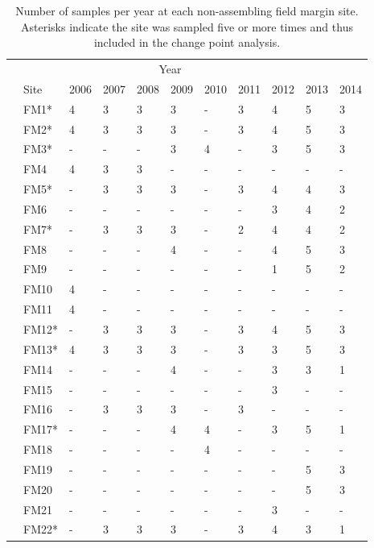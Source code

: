 \documentclass[12pt]{article}
\begin{document}
\begin{table}
  \renewcommand*\arraystretch{1.25}
  \centering
  \caption{Number of samples per year at each non-assembling field
    margin site. Asterisks indicate the site was sampled five or more times
    and thus included in the change point analysis.} 
  \begin{tabular}{lllllllllll}
    \hline
    \multicolumn{10}{c}{\hspace{10em}Year}\\
    & Site & 2006 & 2007 & 2008 & 2009 & 2010 & 2011 & 2012 & 2013 & 2014\\
    \hline
    &FM1* & 4 & 3 & 3 & 3 & - & 3 & 4 & 5 & 3\\
    &FM2* & 4 & 3 & 3 & 3 & - & 3 & 4 & 5 & 3\\
    &FM3* & - & - & - & 3 & 4 & - & 3 & 5 & 3\\
    &FM4 & 4 & 3 & 3 & - & - & - & - & - & -\\
    &FM5* & - & 3 & 3 & 3 & - & 3 & 4 & 4 & 3\\
    &FM6 & - & - & - & - & - & - & 3 & 4 & 2\\
    &FM7* & - & 3 & 3 & 3 & - & 2 & 4 & 4 & 2\\
    &FM8 & - & - & - & 4 & - & - & 4 & 5 & 3\\
    &FM9 & - & - & - & - & - & - & 1 & 5 & 2\\
    &FM10 & 4 & - & - & - & - & - & - & - & -\\
    &FM11 & 4 & - & - & - & - & - & - & - & -\\
    &FM12* & - & 3 & 3 & 3 & - & 3 & 4 & 5 & 3\\
    &FM13* & 4 & 3 & 3 & 3 & - & 3 & 3 & 5 & 3\\
    &FM14 & - & - & - & 4 & - & - & 3 & 3 & 1\\
    &FM15 & - & - & - & - & - & - & 3 & - & -\\
    &FM16 & - & 3 & 3 & 3 & - & 3 & - & - & -\\
    &FM17* & - & - & - & 4 & 4 & - & 3 & 5 & 1\\
    &FM18 & - & - & - & - & 4 & - & - & - & -\\
    &FM19 & - & - & - & - & - & - & - & 5 & 3\\
    &FM20 & - & - & - & - & - & - & - & 5 & 3\\
    &FM21 & - & - & - & - & - & - & 3 & - & -\\
    &FM22* & - & 3 & 3 & 3 & - & 3 & 4 & 3 & 1\\

\end{tabular}
\end{table}
\end{document}
